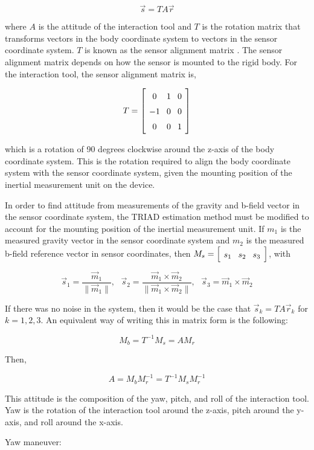\documentclass{article}
\newcommand{\mat}[2][ccccccccccccccccccccccccccccccccccccccccccccc]{\left[
        \arraycolsep=4pt\def\arraystretch{1.5}
        \begin{array}{#1} #2 \\ 
        \end{array} 
        \right]}
\newcommand{\tab}{ \textrm{ \ \ \ \ } }
\begin{document}
\begin{flushleft}
$$ \vec{s} = T A \vec{r} $$

where $A$ is the attitude of the interaction tool and $T$ is the rotation matrix that transforms vectors in the body coordinate system to vectors in the sensor coordinate system. $T$ is known as the sensor alignment matrix \cite{Shuster2004}. The sensor alignment matrix depends on how the sensor is mounted to the rigid body. For the interaction tool, the sensor alignment matrix is, 

$$ T = \mat{0 & 1 & 0 \\ -1 & 0 & 0 \\ 0 & 0 & 1} $$

which is a rotation of 90 degrees clockwise around the z-axis of the body coordinate system. This is the rotation required to align the body coordinate system with the sensor coordinate system, given the mounting position of the inertial measurement unit on the device. 

\medskip

In order to find attitude from measurements of the gravity and b-field vector in the sensor coordinate system, the TRIAD estimation method must be modified to account for the mounting position of the inertial measurement unit. If $m_1$ is the measured gravity vector in the sensor coordinate system and $m_2$ is the measured b-field reference vector in sensor coordinates, then $M_s = \mat{ s_1 & s_2 & s_3 }$, with

$$\vec{s}_1 = \frac{\vec{m}_1}{\| \vec{m}_1 \|}, \tab \vec{s}_2 = \frac{\vec{m}_1 \times \vec{m}_2}{\| \vec{m}_1 \times \vec{m}_2 \|}, \tab \vec{s}_3 = \vec{m}_1 \times \vec{m}_2 $$

If there was no noise in the system, then it would be the case that $\vec{s}_k = T A \vec{r}_k$ for $k=1,2,3$. An equivalent way of writing this in matrix form is the following: 

$$ M_b = T^{-1} M_s = A M_r $$ 

Then, 

$$ A = M_b M_r^{-1} = T^{-1} M_s M_r^{-1} $$

This attitude is the composition of the yaw, pitch, and roll of the interaction tool. Yaw is the rotation of the interaction tool around the z-axis, pitch around the y-axis, and roll around the x-axis. 

\medskip

Yaw maneuver: 


\end{flushleft}
\end{document}
